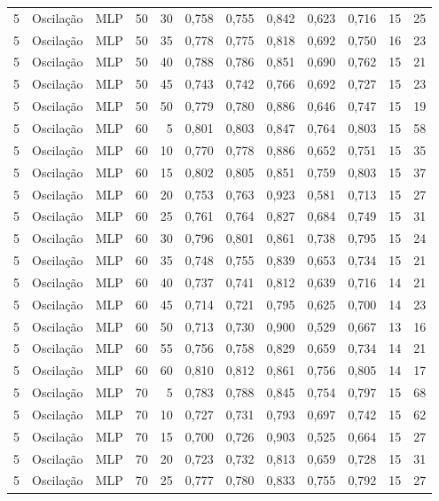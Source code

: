 \begin{longtable}{@{}rllrrrrrrrrr@{}}
5 & Oscilação & MLP & 50 & 30 & 0,758 & 0,755 & 0,842 & 0,623 & 0,716 & 15 & 25 \\
5 & Oscilação & MLP & 50 & 35 & 0,778 & 0,775 & 0,818 & 0,692 & 0,750 & 16 & 23 \\
5 & Oscilação & MLP & 50 & 40 & 0,788 & 0,786 & 0,851 & 0,690 & 0,762 & 15 & 21 \\
5 & Oscilação & MLP & 50 & 45 & 0,743 & 0,742 & 0,766 & 0,692 & 0,727 & 15 & 23 \\
5 & Oscilação & MLP & 50 & 50 & 0,779 & 0,780 & 0,886 & 0,646 & 0,747 & 15 & 19 \\
5 & Oscilação & MLP & 60 & 5 & 0,801 & 0,803 & 0,847 & 0,764 & 0,803 & 15 & 58 \\
5 & Oscilação & MLP & 60 & 10 & 0,770 & 0,778 & 0,886 & 0,652 & 0,751 & 15 & 35 \\
5 & Oscilação & MLP & 60 & 15 & 0,802 & 0,805 & 0,851 & 0,759 & 0,803 & 15 & 37 \\
5 & Oscilação & MLP & 60 & 20 & 0,753 & 0,763 & 0,923 & 0,581 & 0,713 & 15 & 27 \\
5 & Oscilação & MLP & 60 & 25 & 0,761 & 0,764 & 0,827 & 0,684 & 0,749 & 15 & 31 \\
5 & Oscilação & MLP & 60 & 30 & 0,796 & 0,801 & 0,861 & 0,738 & 0,795 & 15 & 24 \\
5 & Oscilação & MLP & 60 & 35 & 0,748 & 0,755 & 0,839 & 0,653 & 0,734 & 15 & 21 \\
5 & Oscilação & MLP & 60 & 40 & 0,737 & 0,741 & 0,812 & 0,639 & 0,716 & 14 & 21 \\
5 & Oscilação & MLP & 60 & 45 & 0,714 & 0,721 & 0,795 & 0,625 & 0,700 & 14 & 23 \\
5 & Oscilação & MLP & 60 & 50 & 0,713 & 0,730 & 0,900 & 0,529 & 0,667 & 13 & 16 \\
5 & Oscilação & MLP & 60 & 55 & 0,756 & 0,758 & 0,829 & 0,659 & 0,734 & 14 & 21 \\
5 & Oscilação & MLP & 60 & 60 & 0,810 & 0,812 & 0,861 & 0,756 & 0,805 & 14 & 17 \\
5 & Oscilação & MLP & 70 & 5 & 0,783 & 0,788 & 0,845 & 0,754 & 0,797 & 15 & 68 \\
5 & Oscilação & MLP & 70 & 10 & 0,727 & 0,731 & 0,793 & 0,697 & 0,742 & 15 & 62 \\
5 & Oscilação & MLP & 70 & 15 & 0,700 & 0,726 & 0,903 & 0,525 & 0,664 & 15 & 27 \\
5 & Oscilação & MLP & 70 & 20 & 0,723 & 0,732 & 0,813 & 0,659 & 0,728 & 15 & 31 \\
5 & Oscilação & MLP & 70 & 25 & 0,777 & 0,780 & 0,833 & 0,755 & 0,792 & 15 & 27 \\

\end{longtable}
